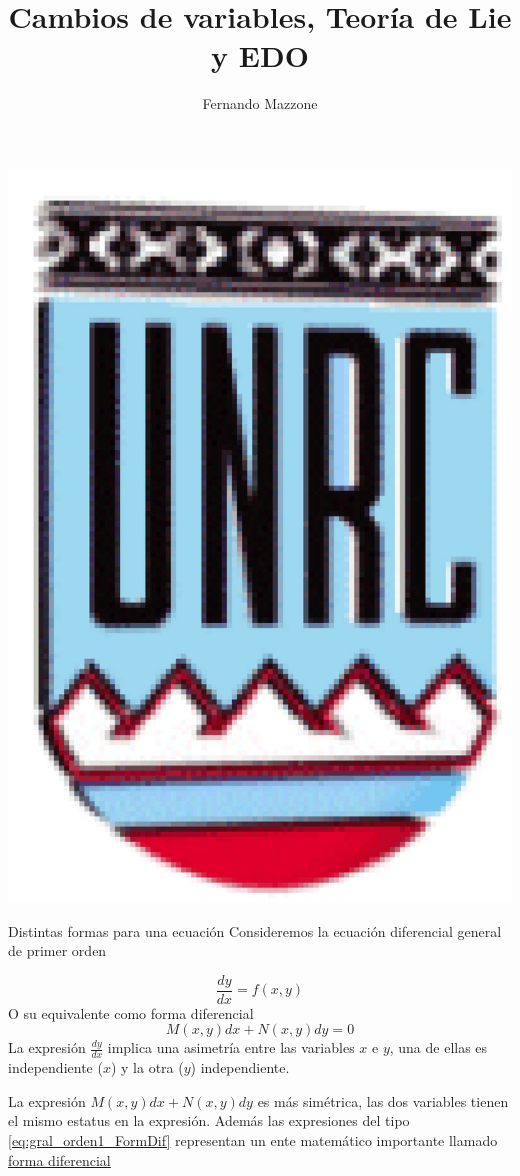 \documentclass[handout,hyperref={colorlinks=true}]{beamer}
\title[Teoría de Lie y ODE] %
{%
Cambios de variables, Teoría de Lie y EDO
}
\author[] %
{Fernando Mazzone}
\institute[Depto de Matemática] %
{
 Depto de Matemática\\
Facultad de Ciencias Exactas Físico-Químicas y Naturales\\
Universidad Nacional de Río Cuarto}
\begin{document}
\begin{frame}
  \maketitle
  \begin{center}
   \includegraphics[scale=0.2]{imagenes/unrc.jpg}
   \end{center}
\end{frame}

\begin{frame}{Distintas formas para una ecuación}
Consideremos la ecuación diferencial general de primer orden 

\begin{equation}\label{eq:gral_orden1}
\frac{dy}{dx}=f(x,y)
\end{equation}
O su equivalente como forma diferencial
\begin{equation}\label{eq:gral_orden1_FormDif}
M(x,y)dx+N(x,y)dy=0
\end{equation}
 La expresión $\frac{dy}{dx}$ implica una asimetría entre las variables $x$ e $y$, una de ellas es independiente ($x$) y la otra ($y$) independiente.

La expresión  $M(x,y)dx+N(x,y)dy$ es más simétrica, las dos variables tienen el mismo estatus en la expresión.  Además las expresiones del tipo \eqref{eq:gral_orden1_FormDif} representan un ente matemático importante llamado \href{http://es.wikipedia.org/wiki/Forma_diferencial}{forma diferencial}


\end{frame}
\end{document}
